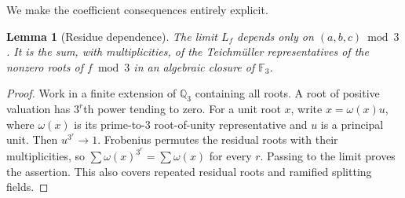 \documentclass[11pt,a4paper]{article}
\newtheorem{lemma}[theorem]{Lemma}
\theoremstyle{definition}\newtheorem{definition}[theorem]{Definition}
\theoremstyle{remark}\newtheorem{remark}[theorem]{Remark}
\newcommand{\Q}{\mathbb Q}\newcommand{\Z}{\mathbb Z}\newcommand{\N}{\mathbb N}\newcommand{\R}{\mathbb R}\newcommand{\C}{\mathbb C}
\begin{document}
We make the coefficient consequences entirely explicit.
\begin{lemma}[Residue dependence]\label{lem:teich}
The limit $L_f$ depends only on $(a,b,c)\bmod3$. It is the sum, with multiplicities, of the Teichm\"uller representatives of the nonzero roots of $f\bmod3$ in an algebraic closure of $\mathbb F_3$.
\end{lemma}
\begin{proof}
Work in a finite extension of $\Q_3$ containing all roots. A root of positive valuation has $3^r$th power tending to zero. For a unit root $x$, write $x=\omega(x)u$, where $\omega(x)$ is its prime-to-$3$ root-of-unity representative and $u$ is a principal unit. Then $u^{3^r}\to1$. Frobenius permutes the residual roots with their multiplicities, so $\sum\omega(x)^{3^r}=\sum\omega(x)$ for every $r$. Passing to the limit proves the assertion. This also covers repeated residual roots and ramified splitting fields.
\end{proof}
\end{document}
